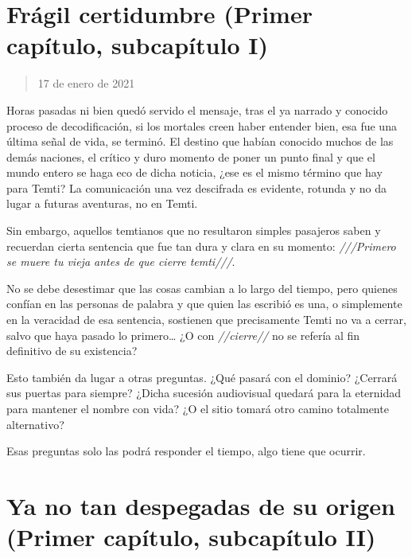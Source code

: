 \documentclass[
  spanish,
]{book}
\begin{document}
\hypertarget{fruxe1gil-certidumbre-primer-capuxedtulo-subcapuxedtulo-i}{%
\section{Frágil certidumbre (Primer capítulo, subcapítulo I)}\label{fruxe1gil-certidumbre-primer-capuxedtulo-subcapuxedtulo-i}}

\begin{quote}
17 de enero de 2021
\end{quote}

Horas pasadas ni bien quedó servido el mensaje, tras el ya narrado y conocido proceso de decodificación, si los mortales creen haber entender bien, esa fue una última señal de vida, se terminó. El destino que habían conocido muchos de las demás naciones, el crítico y duro momento de poner un punto final y que el mundo entero se haga eco de dicha noticia, ¿ese es el mismo término que hay para Temti? La comunicación una vez descifrada es evidente, rotunda y no da lugar a futuras aventuras, no en Temti.

Sin embargo, aquellos temtianos que no resultaron simples pasajeros saben y recuerdan cierta sentencia que fue tan dura y clara en su momento: \emph{///Primero se muere tu vieja antes de que cierre temti///}.

No se debe desestimar que las cosas cambian a lo largo del tiempo, pero quienes confían en las personas de palabra y que quien las escribió es una, o simplemente en la veracidad de esa sentencia, sostienen que precisamente Temti no va a cerrar, salvo que haya pasado lo primero\ldots{} ¿O con \emph{//cierre//} no se refería al fin definitivo de su existencia?

Esto también da lugar a otras preguntas. ¿Qué pasará con el dominio? ¿Cerrará sus puertas para siempre? ¿Dicha sucesión audiovisual quedará para la eternidad para mantener el nombre con vida? ¿O el sitio tomará otro camino totalmente alternativo?

Esas preguntas solo las podrá responder el tiempo, algo tiene que ocurrir.

\hypertarget{ya-no-tan-despegadas-de-su-origen-primer-capuxedtulo-subcapuxedtulo-ii}{%
\section{Ya no tan despegadas de su origen (Primer capítulo, subcapítulo II)}\label{ya-no-tan-despegadas-de-su-origen-primer-capuxedtulo-subcapuxedtulo-ii}}
\end{document}
